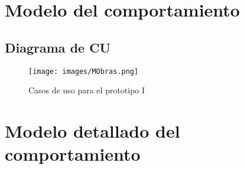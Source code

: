\chapter{Modelo del comportamiento}

\Instrucciones{}


\section{Diagrama de CU}

 	\begin{figure}[h!]
		\centering
			\texttt{[image: images/MObras.png]}
		\caption{Casos de uso para el prototipo I}
	\end{figure}

\Instrucciones{}

\chapter{Modelo detallado del comportamiento} 


